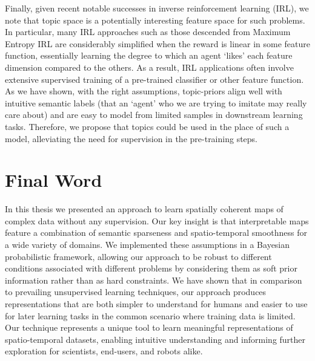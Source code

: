 Finally, given recent notable successes in inverse reinforcement learning (IRL), we note that topic space is a potentially interesting feature space for such problems. In particular, many IRL approaches such as those descended from Maximum Entropy IRL \citep{ziebart2008maximum} are considerably simplified when the reward is linear in some feature function, essentially learning the degree to which an agent `likes' each feature dimension compared to the others. As a result, IRL applications often involve extensive supervised training of a pre-trained classifier or other feature function. As we have shown, with the right assumptions, topic-priors align well with intuitive semantic labels (that an `agent' who we are trying to imitate may really care about) and are easy to model from limited samples in downstream learning tasks. Therefore, we propose that topics could be used in the place of such a model, alleviating the need for supervision in the pre-training steps.

\section{Final Word} \label{sec:conclusion-final-word}
In this thesis we presented an approach to learn spatially coherent maps of complex data without any supervision. Our key insight is that interpretable maps feature a combination of semantic sparseness and spatio-temporal smoothness for a wide variety of domains. We implemented these assumptions in a Bayesian probabilistic framework, allowing our approach to be robust to different conditions associated with different problems by considering them as soft prior information rather than as hard constraints. We have shown that in comparison to prevailing unsupervised learning techniques, our approach produces representations that are both simpler to understand for humans and easier to use for later learning tasks in the common scenario where training data is limited. Our technique represents a unique tool to learn meaningful representations of spatio-temporal datasets, enabling intuitive understanding and informing further exploration for scientists, end-users, and robots alike.